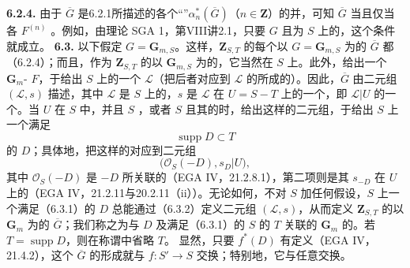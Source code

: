 \textbf{6.2.4.} 由于 $\overline G$ 是6.2.1所描述的各个“”$\alpha_n^*(\overline G)$（$n\in\mathbf Z$）的并，可知 $\overline G$ 当且仅当各 $F^{(n)}$ 。例如，由理论 SGA 1，第VIII讲2.1，只要 $G$ 且为 $S$ 上的，这个条件就成立。
\textbf{6.3.} 以下假定 $G=\mathbf G_{m,S}$。这样，$\mathbf Z_{S,T}$ 的每个以 $G=\mathbf G_{m,S}$ 为的 $\overline G$ 都（6.2.4）；而且，作为 $\mathbf Z_{S,T}$ 的以 $\mathbf G_{m,S}$ 为的，它当然在 $S$ 上。此外，给出一个 $\mathbf G_m$- $F$，于给出 $S$ 上的一个 $\mathcal L$（把后者对应到 $\mathcal L$ 的所成的）。因此，$\overline G$ 由二元组 $(\mathcal L,s)$ 描述，其中 $\mathcal L$ 是 $S$ 上的，$s$ 是 $\mathcal L$ 在 $U=S-T$ 上的一个，即 $\mathcal L|U$ 的一个。当 $U$ 在 $S$ 中，并且 $S$ ，或者 $S$ 且其的时，给出这样的二元组，于给出 $S$ 上一个满足
\[
\operatorname{supp}D\subset T\tag{6.3.1}
\]
的 $D$；具体地，把这样的对应到二元组
\[
\bigl(\mathcal O_S(-D),s_D|U\bigr),\tag{6.3.2}
\]
其中 $\mathcal O_S(-D)$ 是 $-D$ 所关联的（EGA IV，21.2.8.1），第二项则是其 $s_{-D}$ 在 $U$ 上的（EGA IV，21.2.11与20.2.11（ii））。无论如何，不对 $S$ 加任何假设，$S$ 上一个满足（6.3.1）的 $D$ 总能通过（6.3.2）定义二元组 $(\mathcal L,s)$，从而定义 $\mathbf Z_{S,T}$ 的以 $\mathbf G_m$ 为的 $\overline G$；我们称之为与 $D$ 及满足（6.3.1）的 $S$ 的 $T$ 关联的 $\mathbf G_m$ 的。若 $T=\operatorname{supp}D$，则在称谓中省略 $T$。
显然，只要 $f^*(D)$ 有定义（EGA IV，21.4.2），这个 $\overline G$ 的形成就与 $f:S'\to S$ 交换；特别地，它与任意交换。

